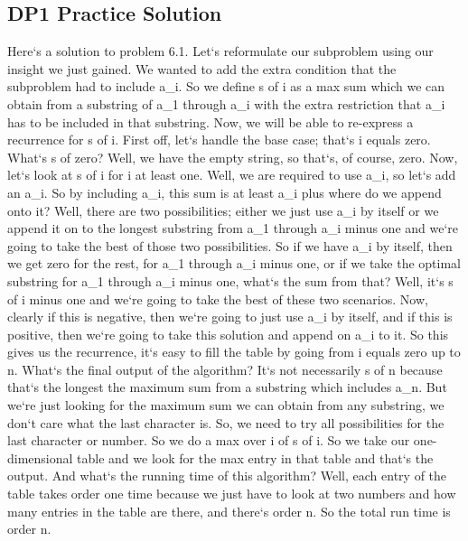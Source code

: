\subsection{DP1  Practice Solution}
Here`s a solution to problem 6.1.
Let`s reformulate our subproblem using our insight we just gained.
We wanted to add the extra condition that the subproblem had to include a\_i.
So we define s of i as a max sum which we can obtain from a substring of a\_1 through a\_i with the extra restriction that a\_i has to be included in that substring.
Now, we will be able to re-express a recurrence for s of i.
First off, let`s handle the base case; that`s i equals zero.
What`s s of zero? Well, we have the empty string, so that`s, of course, zero.
Now, let`s look at s of i for i at least one.
Well, we are required to use a\_i, so let`s add an a\_i.
So by including a\_i, this sum is at least a\_i plus where do we append onto it? Well, there are two possibilities; either we just use a\_i by itself or we append it on to the longest substring from a\_1 through a\_i minus one and we`re going to take the best of those two possibilities.
So if we have a\_i by itself, then we get zero for the rest, for a\_1 through a\_i minus one, or if we take the optimal substring for a\_1 through a\_i minus one, what`s the sum from that? Well, it`s s of i minus one and we`re going to take the best of these two scenarios.
Now, clearly if this is negative, then we`re going to just use a\_i by itself, and if this is positive, then we`re going to take this solution and append on a\_i to it.
So this gives us the recurrence, it`s easy to fill the table by going from i equals zero up to n.
What`s the final output of the algorithm? It`s not necessarily s of n because that`s the longest the maximum sum from a substring which includes a\_n.
But we`re just looking for the maximum sum we can obtain from any substring, we don`t care what the last character is.
So, we need to try all possibilities for the last character or number.
So we do a max over i of s of i.
So we take our one-dimensional table and we look for the max entry in that table and that`s the output.
And what`s the running time of this algorithm? Well, each entry of the table takes order one time because we just have to look at two numbers and how many entries in the table are there, and there`s order n.
So the total run time is order n.

